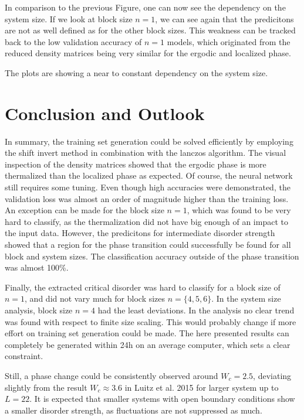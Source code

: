 \documentclass[reprint,amsmath,amssymb,aps,prb]{revtex4-2}
\begin{document}
In comparison to the previous Figure, one can now see the dependency on the system size.
If we look at block size $n=1$, we can see again that the predicitons are not as well defined as for the other block sizes. This weakness can be tracked back to the low validation accuracy of $n=1$ models, which originated from the reduced density matrices being very similar for the ergodic and localized phase.

The plots are showing a near to constant dependency on the system size.

\section{Conclusion and Outlook}

In summary, the training set generation could be solved efficiently by employing the shift invert method in combination with the lanczos algorithm. The visual inspection of the density matrices showed that the ergodic phase is more thermalized than the localized phase as expected. Of course, the neural network still requires some tuning. Even though high accuracies were demonstrated, the validation loss was almost an order of magnitude higher than the training loss. An exception can be made for the block size $n=1$, which was found to be very hard to classify, as the thermalization did not have big enough of an impact to the input data.
However, the predicitons for intermediate disorder strength showed that a region for the phase transition could successfully be found for all block and system sizes. The classification accuracy outside of the phase transition was almost 100\%. 

Finally, the extracted critical disorder was hard to classify for a block size of $n=1$, and did not vary much for block sizes $n=\{4,5,6\}$. In the system size analysis, block size $n=4$ had the least deviations. In the analysis no clear trend was found with respect to finite size scaling. This would probably change if more effort on training set generation could be made. The here presented results can completely be generated within 24h on an average computer, which sets a clear constraint.

Still, a phase change could be consistently observed around $W_c=2.5$, deviating slightly from the result $W_c\approx3.6$ in Luitz et al. 2015 for larger system up to $L=22$.\cite{Luitz2015} It is expected that smaller systems with open boundary conditions show a smaller disorder strength, as fluctuations are not suppressed as much.
\end{document}
